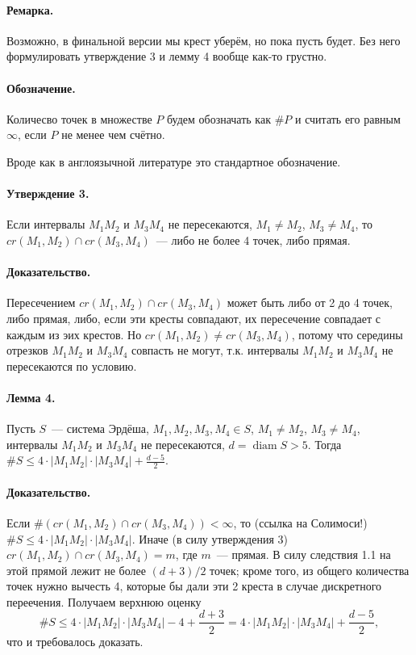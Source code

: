 \paragraph{Ремарка.}
Возможно, в финальной версии мы крест уберём, но пока пусть будет.
Без него формулировать утверждение 3 и лемму 4 вообще как-то грустно.

\paragraph{Обозначение.}
Количесво точек в множестве $P$ будем обозначать как $\#P$
и считать его равным $\infty$, если $P$ не менее чем счётно.

Вроде как в англоязычной литературе это стандартное обозначение.

\paragraph{Утверждение 3.}
Если интервалы $M_1 M_2$ и $M_3 M_4$ не пересекаются,
$M_1 \neq M_2$, $M_3 \neq M_4$,
то $cr(M_1,M_2) \cap cr(M_3,M_4)$~--- либо не более 4 точек, либо прямая.

\paragraph{Доказательство.}
Пересечением $cr(M_1,M_2) \cap cr(M_3,M_4)$ может быть либо от 2 до 4 точек, либо прямая,
либо, если эти кресты совпадают, их пересечение совпадает с каждым из эих крестов.
Но $cr(M_1,M_2) \neq cr(M_3,M_4)$, потому что середины отрезков $M_1 M_2$ и $M_3 M_4$
совпасть не могут, т.к. интервалы $M_1 M_2$ и $M_3 M_4$ не пересекаются по условию.

\paragraph{Лемма 4.}
Пусть $S$~--- система Эрдёша,
$M_1, M_2, M_3, M_4 \in S$,
$M_1 \neq M_2$, $M_3 \neq M_4$,
интервалы $M_1 M_2$ и $M_3 M_4$ не пересекаются,
$d = \mathop{diam} S > 5$.
Тогда $\#S \leq 4 \cdot |M_1 M_2| \cdot |M_3 M_4| + \frac{d-5}{2}$.

\paragraph{Доказательство.}
Если $\#(cr(M_1, M_2) \cap cr(M_3, M_4)) < \infty$,
то (ссылка на Солимоси!)
$\#S \leq 4 \cdot |M_1 M_2| \cdot |M_3 M_4|$.
Иначе (в силу утверждения 3) $cr(M_1, M_2) \cap cr(M_3, M_4) = m$,
где $m$~--- прямая.
В силу следствия 1.1 на этой прямой лежит не более $(d+3)/2$ точек;
кроме того, из общего количества точек нужно вычесть 4,
которые бы дали эти 2 креста в случае дискретного переечения.
Получаем верхнюю оценку
\begin{equation}
	\#S \leq 4 \cdot |M_1 M_2| \cdot |M_3 M_4| - 4 + \frac{d+3}{2}
	=
	4 \cdot |M_1 M_2| \cdot |M_3 M_4| + \frac{d-5}{2},
\end{equation}
что и требовалось доказать.

